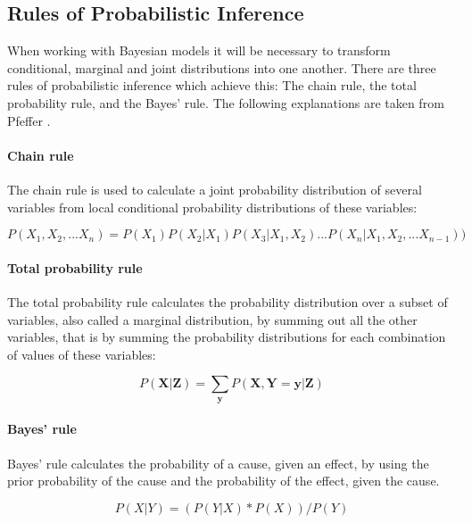 \documentclass{article}
\begin{document}
\begin{appendices}
\section{Rules of Probabilistic Inference}
\label{appendix:Rules of Probabilistic Inference}

When working with Bayesian models it will be necessary to transform conditional, marginal and joint distributions into one another. There are three rules of probabilistic inference which achieve this: The chain rule, the total probability rule, and the Bayes' rule. The following explanations are taken from Pfeffer \cite{9781617292330}.

\paragraph{Chain rule}

The chain rule is used to calculate a \gls{joint probability distribution} of several variables from local \gls{conditional probability distribution}s of these variables:

\begin{equation}
P(X_1 ,X_2 ,...X_n ) = P(X_1 )P(X_2 | X_1 )P(X_3 | X_1 ,X_2 )...P(X_n | X_1 ,X_2 ,...X_{n-1}) )
\end{equation}

\paragraph{Total probability rule}

The total probability rule calculates the probability distribution over a subset of variables, also called a \gls{marginal distribution}, by summing out all the other variables, that is by summing the probability distributions for each combination of values of these variables:

\begin{equation}
P(\boldsymbol X |\boldsymbol Z ) = \sum_{\boldsymbol y}   P(\boldsymbol X ,\boldsymbol Y =\boldsymbol y |\boldsymbol Z )
\end{equation} 

\paragraph{Bayes' rule}

Bayes' rule calculates the probability of a cause, given an effect, by using the prior probability of the cause and the probability of the effect, given the cause. 

\begin{equation}
P(X|Y) = ( P(Y|X) * P(X) ) / P(Y)
\end{equation}
\end{appendices}
	
\end{document}
